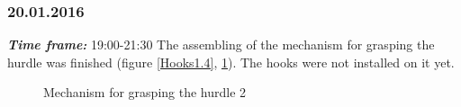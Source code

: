 \subsubsection{20.01.2016}
\textit{\textbf{Time frame:}} 19:00-21:30 \newline
The assembling of the mechanism for grasping the hurdle was finished (figure \ref{Hooks1.4}, \ref{Hooks1.5}). The hooks were not installed on it yet.

\begin{figure}[H]
	\begin{minipage}[h]{0.58\linewidth}
		\caption{Mechanism for grasping the hurdle 1}
		\label{Hooks1.4}
	\end{minipage}
	\hfill
	\begin{minipage}[h]{0.37\linewidth}
		\caption{Mechanism for grasping the hurdle 2}
		\label{Hooks1.5}
	\end{minipage}
\end{figure}
